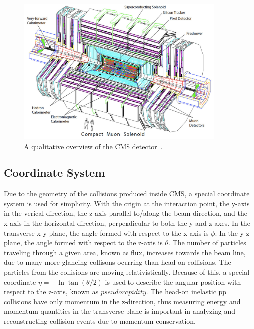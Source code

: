 \begin{figure}[hbtp]
 \begin{center}
   \includegraphics[width=0.9\textwidth]{ch3_figs/cms_overview_white.pdf}
   \caption{A qualitative overview of the CMS detector~\cite{cms_bluebook}.\label{fig:cms_overview}}
 \end{center}
\end{figure}

\subsection{Coordinate System}
Due to the geometry of the collisions produced inside CMS, a special coordinate system is used for simplicity. With the origin at the interaction point,
the y-axis in the verical direction, the z-axis parallel to/along the beam direction, and the x-axis in the horizontal direction, perpendicular to both the y
and z axes. In the transverse x-y plane, the angle formed with respect to the x-axis is $\phi$. In the y-z plane, the angle formed with respect to the z-axis
is $\theta$. The number of particles traveling through a given area, known as flux, increases towards the beam line, due to many more glancing collisons ocurring
than head-on collisions. The particles from the collisions are moving relativistically. Because of this, a special coordinate $\eta = -\ln\tan(\theta/2)$ 
is used to describe the angular position with respect to the z-axis, known as $pseudorapidity$. The head-on inelastic pp collisions have only momentum in the 
z-direction, thus measuring energy and momentum quantities in the transverse plane is important in analyzing and reconstructing collision events due to momentum
conservation.  

